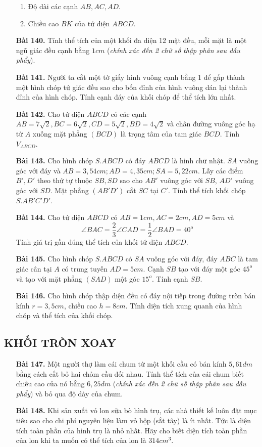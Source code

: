 \documentclass[12pt,a4paper]{article}
\begin{document}
\begin{enumerate}
\begin{enumerate}
            \item Độ dài các cạnh $AB,AC,AD$.
            \item Chiều cao $BK$ của tứ diện $ABCD$.
        \end{enumerate}
    \item[\textbf{Bài 140.}] Tính thể tích của một khối đa diện 12 mặt đều, mỗi mặt là một ngũ giác đều cạnh bằng $1cm$ (\textit{chính xác đến 2 chữ số thập phân sau dấu phẩy}).
    \item[\textbf{Bài 141.}] Người ta cắt một tờ giấy hình vuông cạnh bằng 1 để gấp thành một hình chóp tứ giác đều sao cho bốn đỉnh của hình vuông dán lại thành đỉnh của hình chóp. Tính cạnh đáy của khối chóp để thể tích lớn nhất.
    \item[\textbf{Bài 142.}] Cho tứ diện $ABCD$ có các cạnh $AB = 7\sqrt{2}, BC = 6\sqrt{2}, CD = 5\sqrt{2}, BD = 4\sqrt{2}$ và chân đường vuông góc hạ từ $A$ xuống mặt phẳng $(BCD)$ là trọng tâm của tam giác $BCD$. Tính $V_{ABCD}$.
    \item[\textbf{Bài 143.}] Cho hình chóp $S.ABCD$ có đáy $ABCD$ là hình chữ nhật. $SA$ vuông góc với đáy và $AB = 3,54cm; AD = 4,35cm; SA = 5,22cm.$ Lấy các điểm $B',D'$ theo thứ tự thuộc $SB,SD$ sao cho $AB'$ vuông góc với $SB$, $AD'$ vuông góc với $SD$. Mặt phẳng $(AB'D')$ cắt $SC$ tại $C'$. Tính thể tích khối chóp $S.AB'C'D'$.
    \item[\textbf{Bài 144.}] Cho tứ diện $ABCD$ có $AB=1cm, AC = 2cm, AD = 5cm$ và 
        \[\angle BAC = \frac{2}{3}\angle CAD = \frac{1}{2}\angle BAD = 40^o\]
    Tính giá trị gần đúng thể tích của khối tứ diện $ABCD$.
    \item[\textbf{Bài 145.}] Cho hình chóp $S.ABCD$ có $SA$ vuông góc với đáy, đáy $ABC$ là tam giác cân tại $A$ có trung tuyến $AD = 5cm$. Cạnh $SB$ tạo với đáy một góc $45^o$ và tạo với mặt phẳng $(SAD)$ một góc $15^o$. Tính cạnh $SB$.
    \item[\textbf{Bài 146.}] Cho hình chóp thập diện đều có đáy nội tiếp trong đường tròn bán kính $r = 3,5cm$, chiều cao $h = 8cm$. Tính diện tích xung quanh của hình chóp và thể tích của khối chóp.
\end{enumerate}
\subsection*{KHỐI TRÒN XOAY}
\begin{enumerate}
    \item[\textbf{Bài 147.}] Một người thợ làm cái chum từ một khối cầu có bán kính $5,61dm$ bằng cách cắt bỏ hai chỏm cầu đối nhau. Tính thể tích của cái chum biết chiều cao của nó bằng $6,25dm$ (\textit{chính xác đến 2 chữ số thập phân sau dấu phẩy}) và bỏ qua độ dày của chum.
    \item[\textbf{Bài 148.}] Khi sản xuất vỏ lon sữa bò hình trụ, các nhà thiết kế luôn đặt mục tiêu sao cho chi phí nguyên liệu làm vỏ hộp (sắt tây) là ít nhất. Tức là diện tích toàn phần của hình trụ là nhỏ nhất. Hãy cho biết diện tích toàn phần của lon khi ta muốn có thể tích của lon là $314cm^3$.
\end{enumerate}
\end{document}
